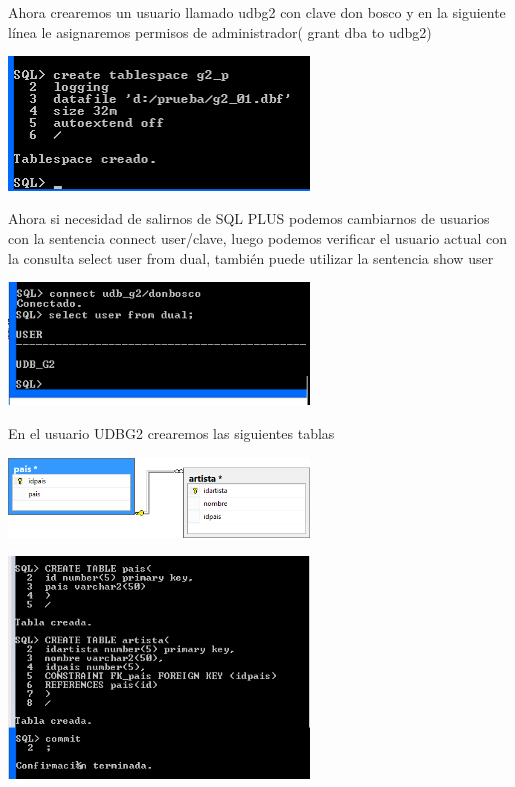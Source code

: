 \begin{enumerate}[1.]
	Ahora crearemos un usuario llamado udbg2 con clave don bosco y en la siguiente l\'inea le asignaremos permisos de administrador( grant dba to 		udbg2)\\
	\begin{center}
	\includegraphics[width=8cm]{./Imagenes/eje7}
	\end{center}
	Ahora si necesidad de salirnos de SQL PLUS podemos cambiarnos de usuarios con la sentencia connect user/clave, luego podemos verificar el usuario actual con la consulta select user from dual, tambi\'en puede utilizar la sentencia show user\\
	\begin{center}
	\includegraphics[width=8cm]{./Imagenes/eje8}
	\end{center}
	En el usuario UDBG2 crearemos las siguientes tablas\\
	\begin{center}
	\includegraphics[width=8cm]{./Imagenes/eje9}
	\end{center}
	\begin{center}
	\includegraphics[width=8cm]{./Imagenes/eje10}

\end{center}
\end{enumerate}
